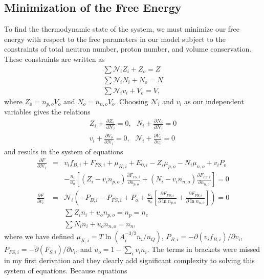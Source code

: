 \documentclass[11pt,letter]{article}
\begin{document}
\subsection{Minimization of the Free Energy}
\label{sec:minimization}
To find the thermodynamic state of the system, we must minimize our free energy
with respect to the free parameters in our model subject to the constraints of
total neutron number, proton number, and volume conservation.  These constraints
are written as \begin{eqnarray}
\sum \mathcal{N}_i Z_i + Z_o = Z \\
\sum \mathcal{N}_i N_i + N_o = N \\
\sum \mathcal{N}_i v_i + V_o = V, 
\end{eqnarray}
where $Z_o = n_{p,o} V_o$ and $N_o = n_{n,o} V_o$.  Choosing $\mathcal{N}_i$ and
$v_i$ as our independent variables gives the relations \begin{eqnarray} 
Z_i + \frac{\partial Z_o}{\partial \mathcal{N}_i} = 0, \,\, \,\,
N_i + \frac{\partial N_o}{\partial \mathcal{N}_i} = 0 \\
v_i + \frac{\partial V_o}{\partial \mathcal{N}_i} = 0, \,\, \,\,
\mathcal{N}_i + \frac{\partial V_o}{\partial v_i} = 0
\end{eqnarray}
and results in the system of equations 
\begin{eqnarray}
\frac{\partial F}{\partial \mathcal{N}_i} &=& v_i f_{B,i} + F_{FS,i} 
+ \mu_{K,i} + E_{0,i} - Z_i \mu_{p,o} - N_i \mu_{n,o} + v_i P_o \nonumber\\
\label{eq:dFdN}
&&- \frac{n_i}{u_o} 
\left[(Z_i-v_i n_{p,o}) \frac{\partial F_{FS,i}}{\partial n_{p,o}} 
+ (N_i-v_i n_{n,o}) \frac{\partial F_{FS,i}}{\partial n_{n,o}} \right] = 0 
\\
\label{eq:dFdv}
\frac{\partial F}{\partial v_i} &=& \mathcal{N}_i 
\left(- P_{B,i} - P_{FS,i} + P_{o} 
+ \frac{n_i}{u_o}\left[\frac{\partial F_{FS,i}}{\partial \ln n_{p,o}} 
+ \frac{\partial F_{FS,i}}{ \partial \ln n_{n,o}}\right]\right) = 0 \\
\label{eq:ncons} 
&&\sum Z_i n_i + u_o n_{p,o} = n_p = n_e \\
\label{eq:pcons} 
&&\sum N_i n_i + u_o n_{n,o} = n_n,
\end{eqnarray}
where we have defined $\mu_{K,i} = T \ln (A_i^{-3/2} n_i/n_Q)$, 
$P_{B,i} = -\partial (v_i f_{B,i}) / \partial v_i$,  
$P_{FS,i} = -\partial (F_{S,i}) / \partial v_i$, and $u_o = 1 - \sum_i v_i n_i$. 
The terms in brackets were missed in my first derivation and they clearly add 
significant complexity to solving this system of equations. Because equations 
\end{document}
